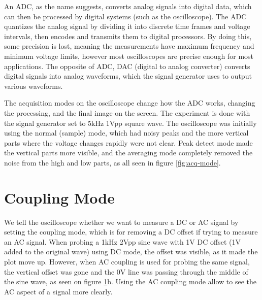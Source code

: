 \documentclass[a4paper, 12pt]{article}
\begin{document}
An ADC, as the name suggests, converts analog signals into digital data, which can then be processed by digital systems (such as the oscilloscope).
The ADC quantizes the analog signal by dividing it into discrete time frames and voltage intervals, then encodes and transmits them to digital processors.
By doing this, some precision is lost, meaning the measurements have maximum frequency and minimum voltage limits, however most oscilloscopes are precise enough for most applications.
The opposite of ADC, DAC (digital to analog converter) converts digital signals into analog waveforms, which the signal generator uses to output various waveforms.

The acquisition modes on the oscilloscope change how the ADC works, changing the processing, and the final image on the screen.
The experiment is done with the signal generator set to 5kHz 1Vpp square wave.
The oscilloscope was initially using the normal (sample) mode, which had noisy peaks and the more vertical parts where the voltage changes rapidly were not clear.
Peak detect mode made the vertical parts more visible,
and the averaging mode completely removed the noise from the high and low parts, as all seen in figure \ref{fig:acq-mode}.

\section{Coupling Mode}

We tell the oscilloscope whether we want to measure a DC or AC signal by setting the coupling mode,
which is for removing a DC offset if trying to measure an AC signal.
When probing a 1kHz 2Vpp sine wave with 1V DC offset (1V added to the original wave) using DC mode, the offset was visible, as it made the plot move up.
However, when AC coupling is used for probing the same signal, the vertical offset was gone and the 0V line was passing through the middle of the sine wave, as seen on figure \ref{fig:acdc-coup}b.
Using the AC coupling mode allow to see the AC aspect of a signal more clearly.

\begin{figure}[!h]
	\centering
	\hfill
	\caption{}
	\label{fig:acdc-coup}
\end{figure}
\end{document}
